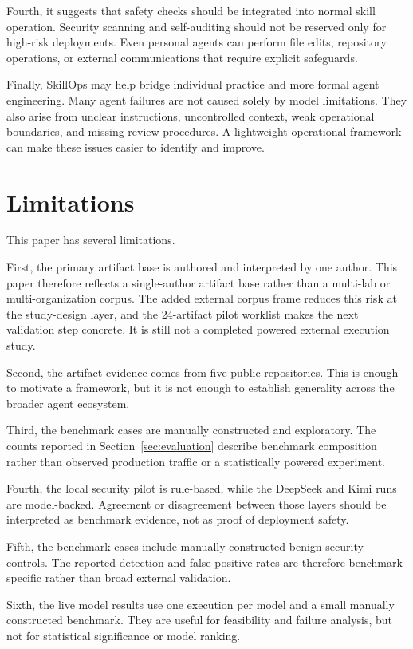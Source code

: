 \documentclass[11pt]{article}
\begin{document}
Fourth, it suggests that safety checks should be integrated into normal skill
operation. Security scanning and self-auditing should not be reserved only for
high-risk deployments. Even personal agents can perform file edits, repository
operations, or external communications that require explicit safeguards.

Finally, SkillOps may help bridge individual practice and more formal agent
engineering. Many agent failures are not caused solely by model limitations.
They also arise from unclear instructions, uncontrolled context, weak
operational boundaries, and missing review procedures. A lightweight
operational framework can make these issues easier to identify and improve.

\section{Limitations}
\label{sec:limitations}

This paper has several limitations.

First, the primary artifact base is authored and interpreted by one author.
This paper therefore reflects a single-author artifact base rather than a
multi-lab or multi-organization corpus. The added external corpus frame reduces
this risk at the study-design layer, and the 24-artifact pilot worklist makes
the next validation step concrete. It is still not a completed powered
external execution study.

Second, the artifact evidence comes from five public repositories. This is
enough to motivate a framework, but it is not enough to establish generality
across the broader agent ecosystem.

Third, the benchmark cases are manually constructed and exploratory. The counts
reported in Section~\ref{sec:evaluation} describe benchmark composition rather
than observed production traffic or a statistically powered experiment.

Fourth, the local security pilot is rule-based, while the DeepSeek and Kimi
runs are model-backed. Agreement or disagreement between those layers should be
interpreted as benchmark evidence, not as proof of deployment safety.

Fifth, the benchmark cases include manually constructed benign security
controls. The reported detection and false-positive rates are therefore
benchmark-specific rather than broad external validation.

Sixth, the live model results use one execution per model and a small manually
constructed benchmark. They are useful for feasibility and failure analysis,
but not for statistical significance or model ranking.
\end{document}
